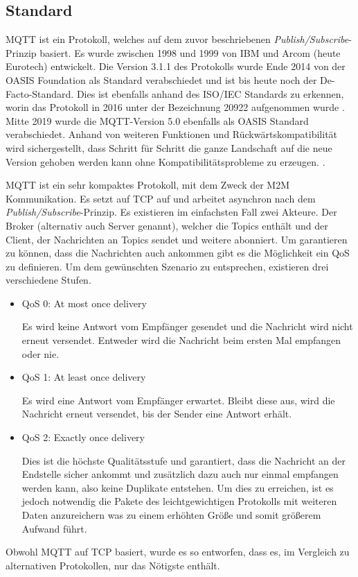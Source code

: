     \subsection{Standard}
        \ac{MQTT} ist ein Protokoll, welches auf dem zuvor beschriebenen \emph{Publish/Subscribe}-Prinzip basiert. Es wurde zwischen 1998 und 1999 von IBM und Arcom (heute Eurotech) entwickelt. Die Version 3.1.1 des Protokolls wurde Ende 2014 von der OASIS Foundation als Standard verabschiedet und ist bis heute noch der De-Facto-Standard. Dies ist ebenfalls anhand des ISO/IEC Standards zu erkennen, worin das Protokoll in 2016 unter der Bezeichnung 20922 aufgenommen wurde \cite{eclipse_foundation2017}. Mitte 2019 wurde die MQTT-Version 5.0 ebenfalls als OASIS Standard verabschiedet. Anhand von weiteren Funktionen und Rückwärtskompatibilität wird sichergestellt, dass Schritt für Schritt die ganze Landschaft auf die neue Version gehoben werden kann ohne Kompatibilitätsprobleme zu erzeugen. \cite{mqtt_org_2019}.
        
        \ac{MQTT} ist ein sehr kompaktes Protokoll, mit dem Zweck der \ac{M2M} Kommunikation.
        Es setzt auf \ac{TCP} auf und arbeitet asynchron
        nach dem \emph{Publish/Subscribe}-Prinzip. Es existieren im einfachsten Fall zwei Akteure. Der Broker (alternativ auch \glqq Server\grqq{} genannt), welcher die Topics enthält und der Client, der Nachrichten an Topics sendet und weitere abonniert.
        Um garantieren zu können, dass die Nachrichten auch ankommen gibt es die Möglichkeit ein \ac{QoS} zu definieren. Um dem gewünschten Szenario zu entsprechen, existieren drei verschiedene Stufen. 
        \cite{soni2017survey}
        \begin{itemize}
            \item \glqq QoS 0: At most once delivery\grqq{}
            
            Es wird keine Antwort vom Empfänger gesendet und die Nachricht wird nicht erneut versendet. Entweder wird die Nachricht beim ersten Mal empfangen oder nie.
            \item \glqq QoS 1: At least once delivery\grqq{}
            
            Es wird eine Antwort vom Empfänger erwartet. Bleibt diese aus, wird die Nachricht erneut versendet, bis der Sender eine Antwort erhält.
            \item \glqq QoS 2: Exactly once delivery\grqq{}
            
            Dies ist die höchste Qualitätsstufe und garantiert, dass die Nachricht an der Endstelle sicher ankommt und zusätzlich dazu auch nur einmal empfangen werden kann, also keine Duplikate entstehen. Um dies zu erreichen, ist es jedoch notwendig die Pakete des leichtgewichtigen Protokolls mit weiteren Daten anzureichern was zu einem erhöhten Größe und somit größerem Aufwand führt.
        \end{itemize} \cite{gupta_banks_2015}
        Obwohl \ac{MQTT} auf \ac{TCP} basiert, wurde es so entworfen, dass es, im Vergleich zu alternativen Protokollen, nur das Nötigste enthält. \cite{soni2017survey}

